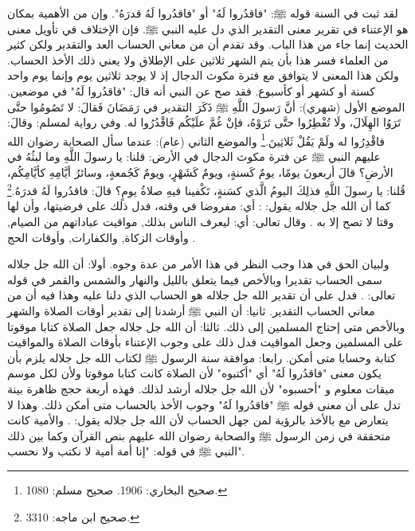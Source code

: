 لقد ثبت في السنة قوله ﷺ: "فاقدُروا لَهُ" أو "فاقدُروا لَهُ قدرَهُ". وإن من الأهمية بمكان هو الإعتناء في تقرير معنى التقدير الذي دل عليه النبي ﷺ. فإن الإختلاف في تأويل معنى الحديث إنما جاء من هذا الباب. وقد تقدم أن من معاني الحساب العد والتقدير ولكن كثير من العلماء فسر هذا بأن يتم الشهر ثلاثين على الإطلاق ولا يعني ذلك الأخذ الحساب. ولكن هذا المعنى لا يتوافق مع فترة مكوث الدجال إذ لا يوجد ثلاثين يوم وإنما يوم واحد كسنة أو كشهر أو كأسبوع. فقد صح عن النبي أنه قال: "فاقدُروا لَهُ" في موضعين. الموضع الأول (شهري): 
أنَّ رَسولَ اللَّهِ ﷺ ذَكَرَ التقدير في رَمَضَانَ فَقالَ: لا تَصُومُوا حتَّى تَرَوُا الهِلَالَ، ولَا تُفْطِرُوا حتَّى تَرَوْهُ، فإنْ غُمَّ علَيْكُم فَاقْدُرُوا له. وفي رواية لمسلم: وقالَ: فاقْدِرُوا له ولَمْ يَقُلْ ثَلاثِينَ.\footnote{صحيح البخاري: 1906. صحيح مسلم: 1080.} والموضع الثاني (عام): عندما سأل الصحابة رضوان الله عليهم النبي ﷺ عن فترة مكوث الدجال في الأرض: قلنا: يا رسولَ اللَّهِ وما لبثُهُ في الأرضِ؟ قالَ أربعونَ يومًا، يومٌ كَسنةٍ، ويومٌ كَشَهْرٍ، ويومٌ كَجُمعةٍ، وسائرُ أيَّامِهِ كأيَّامِكُم، قُلنا: يا رسولَ اللَّهِ فذلِكَ اليومُ الَّذي كسَنةٍ، تَكْفينا فيهِ صلاةُ يومٍ؟ قالَ: فاقدُروا لَهُ قدرَهُ.\footnote{صحيح ابن ماجه: 3310.} كما أن الله جل جلاله يقول: \quranayah*[4][103][14] {\footnotesize (\surahname*[4])}:  أي: مفروضا في وقته، فدل ذلك على فرضيتها، وأن لها وقتا لا تصح إلا به \cite{tafsir_Saadi}. وقال تعالى: \quranayah*[2][189][1-8] {\footnotesize (\surahname*[2])} أي: ليعرف الناس بذلك, مواقيت عباداتهم من الصيام, وأوقات الزكاة, والكفارات, وأوقات الحج \cite{tafsir_Saadi}.

ولبيان الحق في هذا وجب النظر في هذا الأمر من عدة وجوه. أولا: أن الله جل جلاله سمى الحساب تقديرا وبالأخص فيما يتعلق بالليل والنهار والشمس والقمر في قوله تعالى: \quranayah*[6][96] {\footnotesize (\surahname*[6])}. فدل على أن تقدير الله جل جلاله هو الحساب الذي دلنا عليه وهذا فيه أن من معاني الحساب التقدير. ثانيا: أن النبي ﷺ أرشدنا إلى تقدير أوقات الصلاة والشهر وبالأخص متى إحتاج المسلمين إلى ذلك. ثالثا: أن الله جل جلاله جعل الصلاة كتابا موقوتا على المسلمين وجعل المواقيت فدل ذلك على وجوب الإعتناء بأوقات الصلاة والمواقيت كتابة وحسابا متى أمكن. رابعا: موافقة سنة الرسول ﷺ لكتاب الله جل جلاله يلزم بأن يكون معنى "فاقدُروا لَهُ" أي "أكتبوه" لأن الصلاة كانت كتابا موقوتا ولأن لكل موسم ميقات معلوم و "أحسبوه" لأن الله جل جلاله أرشد لذلك. فهذه أربعة حجج ظاهرة بينة تدل على أن معنى قوله ﷺ "فاقدُروا لَهُ" وجوب الأخذ بالحساب متى أمكن ذلك. وهذا لا يتعارض مع بالأخذ بالرؤية لمن جهل الحساب لأن الله جل جلاله يقول: \quranayah*[22][78][8-14] {\footnotesize (\surahname*[22])}. والأمية كانت متحققة في زمن الرسول ﷺ والصحابة رضوان الله عليهم بنص القرآن وكما بين ذلك النبي ﷺ في قوله: "إنا أمة أمية لا نكتب ولا نحسب". 

